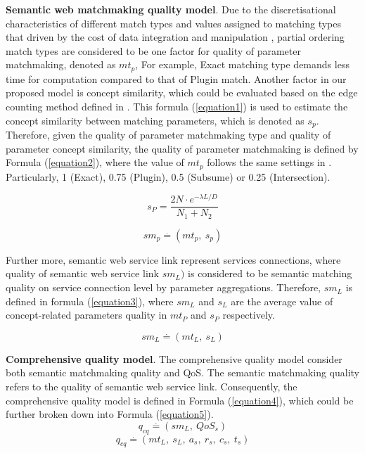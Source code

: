 \documentclass{IEEEtran}
\begin{document}
\textbf{Semantic web matchmaking quality model}. Due to the discretisational characteristics of different match types and values assigned to matching types that driven by the cost of data integration and manipulation \cite{lecue2009optimizing}, partial ordering match types are considered to be one factor for quality of parameter matchmaking, denoted as $mt_{p}$,  For example, Exact matching type demands less time for computation compared to that of Plugin match. Another factor in our proposed model is concept similarity, which could be evaluated based on the edge counting method defined in \cite{shet2012new}. This formula (\ref{equation1}) is used to estimate the concept similarity between matching parameters, which is denoted as $s_{p}$. Therefore, given the quality of parameter matchmaking type and quality of parameter concept similarity, the quality of parameter matchmaking is defined by Formula (\ref{equation2}), where the value of $mt_{p}$ follows the same settings in \cite{lecue2009optimizing}. Particularly, 1 (Exact), 0.75 (Plugin), 0.5 (Subsume) or 0.25 (Intersection). 

\begin{equation}
s_{P}{=} \frac{2N \cdot e^{-\lambda L/D} }{N_{1}+N_{2}}
\label{equation1}
\end{equation}

\begin{equation}
\label{equation2}
sm_{p} \stackrel{.}{=} (mt_ {p}, \  s_ {p})
\end{equation}

Further more, semantic web service link represent services connections, where quality of semantic web service link $sm_{L})$ is considered to be semantic matching quality on service connection level by parameter aggregations. Therefore, $sm_{L}$ is defined in formula (\ref{equation3}), where $sm_{L}$ and $s_{L}$ are the average value of concept-related parameters quality in $mt_{P}$ and $s_{P}$ respectively. 

\begin{equation}
\label{equation3}
sm_{L} \stackrel{.}{=} (mt_ {L}, \  s_ {L})
\end{equation}

\textbf{Comprehensive quality model}. The comprehensive quality model consider both semantic matchmaking quality and QoS. The semantic matchmaking quality refers to the quality of semantic web service link. Consequently, the comprehensive quality model is defined in Formula (\ref{equation4}), which could be further broken down into Formula (\ref{equation5}). 
\begin{equation}
\label{equation4}
q_{cq} \stackrel{.}{=} (sm_ {L}, \  QoS_ {s})
\end{equation}
\begin{equation}
\label{equation5}
q_{cq} \stackrel{.}{=} (mt_ {L}, \  s_ {L}, \  a_{s},\  r_{s},\  c_{s},\  t_{s})
\end{equation}
\end{document}
